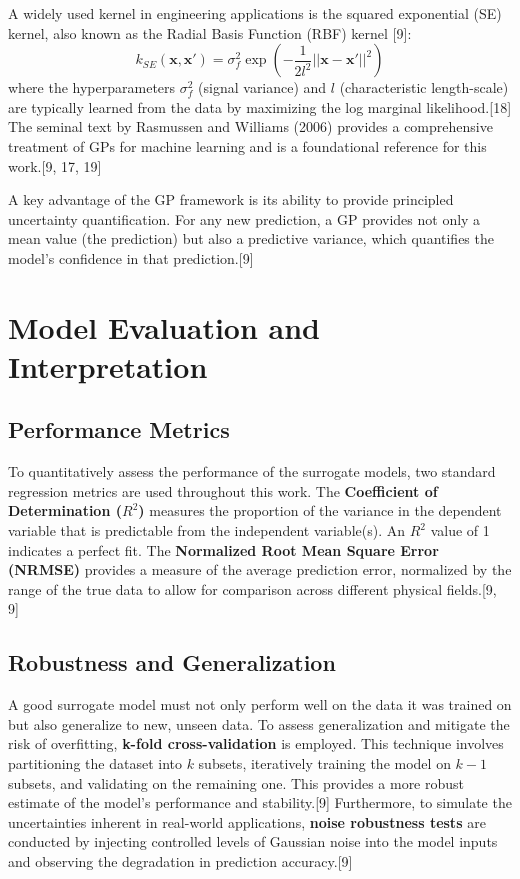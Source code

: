 \documentclass[12pt, a4paper]{report}
\begin{document}
A widely used kernel in engineering applications is the squared exponential (SE) kernel, also known as the Radial Basis Function (RBF) kernel [9]:
$$
k_{SE}(\mathbf{x}, \mathbf{x}') = \sigma_f^2 \exp\left(-\frac{1}{2l^2} ||\mathbf{x} - \mathbf{x}'||^2\right)
$$
where the hyperparameters $\sigma_f^2$ (signal variance) and $l$ (characteristic length-scale) are typically learned from the data by maximizing the log marginal likelihood.[18] The seminal text by Rasmussen and Williams (2006) provides a comprehensive treatment of GPs for machine learning and is a foundational reference for this work.[9, 17, 19]

A key advantage of the GP framework is its ability to provide principled uncertainty quantification. For any new prediction, a GP provides not only a mean value (the prediction) but also a predictive variance, which quantifies the model's confidence in that prediction.[9]

\section{Model Evaluation and Interpretation}

\subsection{Performance Metrics}
To quantitatively assess the performance of the surrogate models, two standard regression metrics are used throughout this work. The \textbf{Coefficient of Determination ($R^2$)} measures the proportion of the variance in the dependent variable that is predictable from the independent variable(s). An $R^2$ value of 1 indicates a perfect fit. The \textbf{Normalized Root Mean Square Error (NRMSE)} provides a measure of the average prediction error, normalized by the range of the true data to allow for comparison across different physical fields.[9, 9]

\subsection{Robustness and Generalization}
A good surrogate model must not only perform well on the data it was trained on but also generalize to new, unseen data. To assess generalization and mitigate the risk of overfitting, \textbf{k-fold cross-validation} is employed. This technique involves partitioning the dataset into $k$ subsets, iteratively training the model on $k-1$ subsets, and validating on the remaining one. This provides a more robust estimate of the model's performance and stability.[9] Furthermore, to simulate the uncertainties inherent in real-world applications, \textbf{noise robustness tests} are conducted by injecting controlled levels of Gaussian noise into the model inputs and observing the degradation in prediction accuracy.[9]
\end{document}
